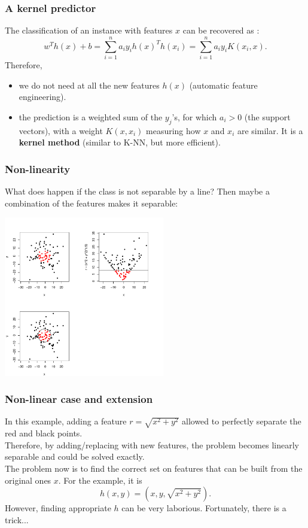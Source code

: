 \begin{frame}
\frametitle{A kernel predictor}
The classification of an instance with features $x$ can be recovered as :
$$
w^Th(x) + b = \sum_{i=1}^n a_i y_i h(x)^Th(x_i) = \sum_{i=1}^n a_i y_i K(x_i,x). 
$$
Therefore, 
\begin{itemize}
\item we do not need at all the new features $h(x)$ (automatic feature engineering).
\item the prediction is a weighted sum of the $y_j$'s, for which $a_i>0$ (the support vectors), with a weight $K(x,x_i)$ measuring how $x$ and $x_i$ are similar. It is a {\bf kernel method} (similar to K-NN, but more efficient).
\end{itemize}
\end{frame}
\begin{frame}
\frametitle{Non-linearity}
What does happen if the class is not separable by a line? Then maybe a combination of the features makes it separable:
\vspace{-0.5cm}
\begin{center}
\includegraphics[width=7cm]{../../Graphs/svm_quad.pdf} 
\end{center}
\end{frame}
\begin{frame}
\frametitle{Non-linear case and extension}
In this example, adding a feature $r = \sqrt{x^2+y^2}$ allowed to perfectly separate the red and black points. \\
\vspace{0.3cm}
Therefore, by adding/replacing with new features, the problem becomes linearly separable and could be solved exactly. \\
\vspace{0.3cm}
The problem now is to find the correct set on features that can be built from the original ones $x$. For the example, it is
$$
h(x,y) = \left(x, y, \sqrt{x^2+y^2}\right).
$$
However, finding appropriate $h$ can be very laborious. Fortunately, there is a trick...
\end{frame}

